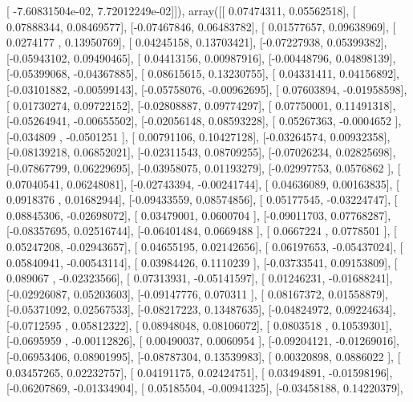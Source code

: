 \documentclass{article}
\begin{document}
       [ -7.60831504e-02,   7.72012249e-02]]), array([[ 0.07474311,  0.05562518],
       [ 0.07888344,  0.08469577],
       [-0.07467846,  0.06483782],
       [ 0.01577657,  0.09638969],
       [ 0.0274177 ,  0.13950769],
       [ 0.04245158,  0.13703421],
       [-0.07227938,  0.05399382],
       [-0.05943102,  0.09490465],
       [ 0.04413156,  0.00987916],
       [-0.00448796,  0.04898139],
       [-0.05399068, -0.04367885],
       [ 0.08615615,  0.13230755],
       [ 0.04331411,  0.04156892],
       [-0.03101882, -0.00599143],
       [-0.05758076, -0.00962695],
       [ 0.07603894, -0.01958598],
       [ 0.01730274,  0.09722152],
       [-0.02808887,  0.09774297],
       [ 0.07750001,  0.11491318],
       [-0.05264941, -0.00655502],
       [-0.02056148,  0.08593228],
       [ 0.05267363, -0.0004652 ],
       [-0.034809  , -0.0501251 ],
       [ 0.00791106,  0.10427128],
       [-0.03264574,  0.00932358],
       [-0.08139218,  0.06852021],
       [-0.02311543,  0.08709255],
       [-0.07026234,  0.02825698],
       [-0.07867799,  0.06229695],
       [-0.03958075,  0.01193279],
       [-0.02997753,  0.0576862 ],
       [ 0.07040541,  0.06248081],
       [-0.02743394, -0.00241744],
       [ 0.04636089,  0.00163835],
       [ 0.0918376 ,  0.01682944],
       [-0.09433559,  0.08574856],
       [ 0.05177545, -0.03224747],
       [ 0.08845306, -0.02698072],
       [ 0.03479001,  0.0600704 ],
       [-0.09011703,  0.07768287],
       [-0.08357695,  0.02516744],
       [-0.06401484,  0.0669488 ],
       [ 0.0667224 ,  0.0778501 ],
       [ 0.05247208, -0.02943657],
       [ 0.04655195,  0.02142656],
       [ 0.06197653, -0.05437024],
       [ 0.05840941, -0.00543114],
       [ 0.03984426,  0.1110239 ],
       [-0.03733541,  0.09153809],
       [ 0.089067  , -0.02323566],
       [ 0.07313931, -0.05141597],
       [ 0.01246231, -0.01688241],
       [-0.02926087,  0.05203603],
       [-0.09147776,  0.070311  ],
       [ 0.08167372,  0.01558879],
       [-0.05371092,  0.02567533],
       [-0.08217223,  0.13487635],
       [-0.04824972,  0.09224634],
       [-0.0712595 ,  0.05812322],
       [ 0.08948048,  0.08106072],
       [ 0.0803518 ,  0.10539301],
       [-0.0695959 , -0.00112826],
       [ 0.00490037,  0.0060954 ],
       [-0.09204121, -0.01269016],
       [-0.06953406,  0.08901995],
       [-0.08787304,  0.13539983],
       [ 0.00320898,  0.0886022 ],
       [ 0.03457265,  0.02232757],
       [ 0.04191175,  0.02424751],
       [ 0.03494891, -0.01598196],
       [-0.06207869, -0.01334904],
       [ 0.05185504, -0.00941325],
       [-0.03458188,  0.14220379],
\end{document}
